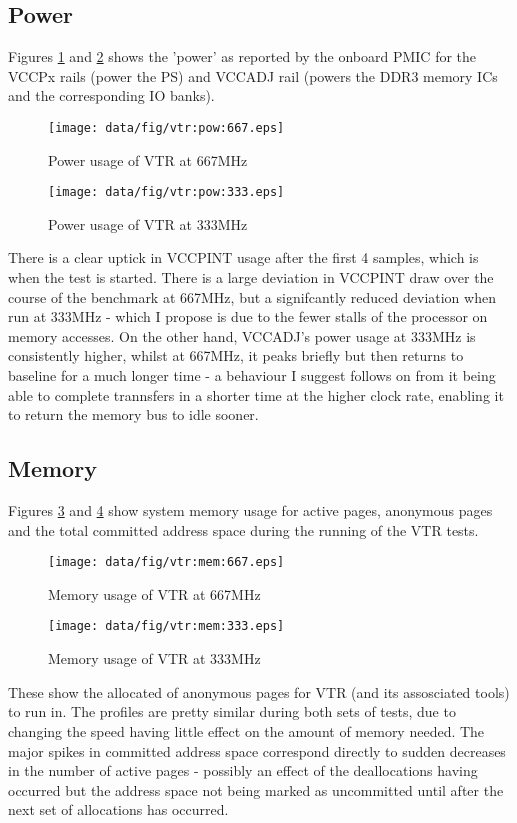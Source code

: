 \documentclass[a4paper]{article}
\begin{document}
  \subsection{Power}
    Figures \ref{fig:vtr:pow:667} and \ref{fig:vtr:pow:333} shows the 'power' as reported by the onboard PMIC for the VCCPx rails (power the PS) and VCCADJ rail (powers the DDR3 memory ICs and the corresponding IO banks).
    \begin{figure}[p]
      \texttt{[image: data/fig/vtr:pow:667.eps]}
      \caption{Power usage of VTR at 667MHz}
      \label{fig:vtr:pow:667}
    \end{figure}
    \begin{figure}[p]
      \texttt{[image: data/fig/vtr:pow:333.eps]}
      \caption{Power usage of VTR at 333MHz}
      \label{fig:vtr:pow:333}
    \end{figure}
    There is a clear uptick in VCCPINT usage after the first 4 samples, which is when the test is started. There is a large deviation in VCCPINT draw over the course of the benchmark at 667MHz, but a signifcantly reduced deviation when run at 333MHz - which I propose is due to the fewer stalls of the processor on memory accesses. On the other hand, VCCADJ's power usage at 333MHz is consistently higher, whilst at 667MHz, it peaks briefly but then returns to baseline for a much longer time - a behaviour I suggest follows on from it being able to complete trannsfers in a shorter time at the higher clock rate, enabling it to return the memory bus to idle sooner.

  \subsection{Memory}
    Figures \ref{fig:vtr:mem:667} and \ref{fig:vtr:mem:333} show system memory usage for active pages, anonymous pages and the total committed address space during the running of the VTR tests.
    \begin{figure}[p]
      \texttt{[image: data/fig/vtr:mem:667.eps]}
      \caption{Memory usage of VTR at 667MHz}
      \label{fig:vtr:mem:667}
    \end{figure}
    \begin{figure}[p]
      \texttt{[image: data/fig/vtr:mem:333.eps]}
      \caption{Memory usage of VTR at 333MHz}
      \label{fig:vtr:mem:333}
    \end{figure}
    These show the allocated of anonymous pages for VTR (and its assosciated tools) to run in. The profiles are pretty similar during both sets of tests, due to changing the speed having little effect on the amount of memory needed. The major spikes in committed address space correspond directly to sudden decreases in the number of active pages - possibly an effect of the deallocations having occurred but the address space not being marked as uncommitted until after the next set of allocations has occurred.
\end{document}
